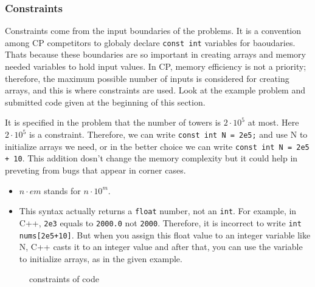 \documentclass[12pt, a4paper]{article}
\begin{document}
\subsubsection{Constraints}
Constraints come from the input boundaries of the problems. It is a convention among CP competitors to globaly declare \lstinline{const int} variables for baoudaries. Thats because these boundaries are so important in creating arrays and memory needed variables to hold input values. In CP, memory efficiency is not a priority; therefore, the maximum possible number of inputs is considered for creating arrays, and this is where constraints are used.
Look at the example problem and submitted code given at the beginning of this section. 

It is specified in the problem that the number of towers is $2\cdot10^5$ at most. Here $2\cdot10^5$ is a constraint. Therefore, we can write \lstinline{const int N = 2e5;} and use N to initialize arrays we need, or in the better choice we can write \lstinline{const int N = 2e5 + 10}. This addition dosn't change the memory complexity but it could help in preveting from bugs that appear in corner cases.

\begin{itemize}
\item $n\cdot em$ stands for $n\cdot10^m$.
\item This syntax actually returns a \lstinline{float} number, not an \lstinline{int}. For example, in C++, \lstinline{2e3} equals to \lstinline{2000.0} not \lstinline{2000}. Therefore, it is incorrect to write \lstinline{int nums[2e5+10]}. But when you assign this float value to an integer variable like N, C++ casts it to an integer value and after that, you can use the variable to initialize arrays, as in the given example.
\end{itemize}

\begin{figure}[!h]
\centering
{}
\caption{constraints  of code}
\end{figure}
\end{document}
